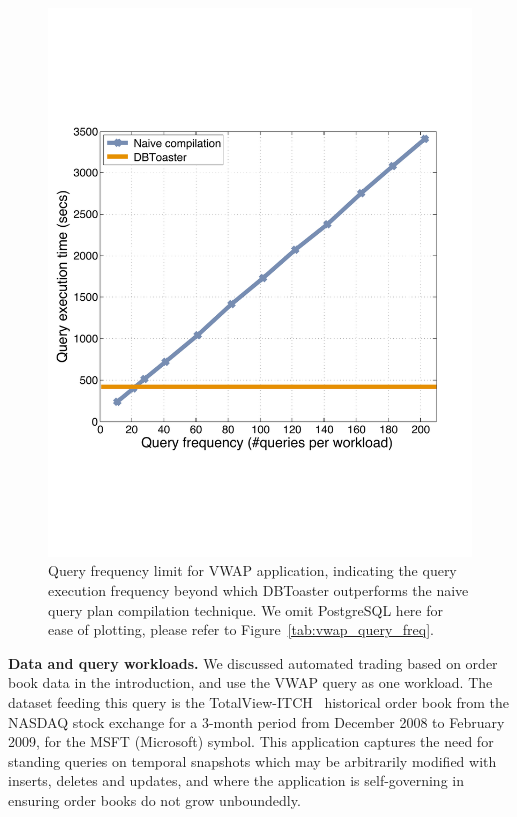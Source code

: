 \begin{figure}[tb]
\begin{center}
\includegraphics[scale=0.4]{../plots/vwap_query_freq_dn.pdf}
\end{center}
\vspace{-4mm}
\caption{Query frequency limit for VWAP application, indicating the
query execution frequency beyond which DBToaster outperforms the naive query
plan compilation technique. We omit PostgreSQL here for ease of
plotting, please refer to Figure~\ref{tab:vwap_query_freq}.}
\label{fig:vwap_query_freq}
\end{figure}

\textbf{Data and query workloads.}
We discussed automated trading based on order book data in the introduction, and
use the VWAP query as one workload. The dataset feeding this query is the
TotalView-ITCH~\cite{totalview-url} historical order book from the NASDAQ stock
exchange for a 3-month period from December 2008 to February 2009, for the MSFT
(Microsoft) symbol. This application captures the need for standing queries on
temporal snapshots which may be arbitrarily modified with inserts, deletes and
updates, and where the application is self-governing in ensuring order books do
not grow unboundedly.

